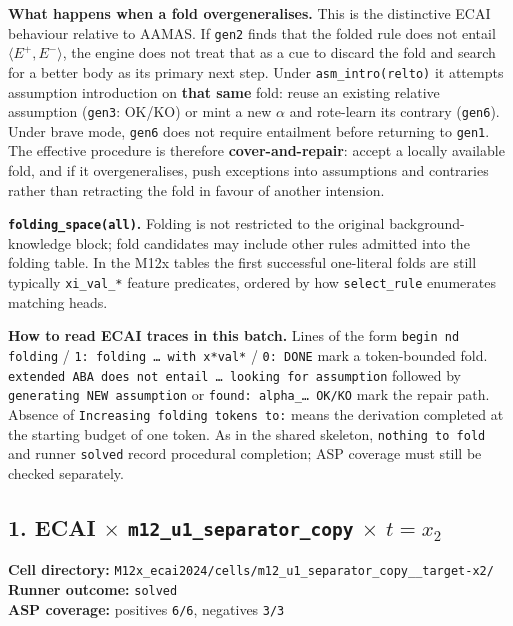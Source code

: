 \documentclass[11pt]{article}
\begin{document}
\textbf{What happens when a fold overgeneralises.} This is the distinctive ECAI behaviour relative to AAMAS. If \texttt{gen2} finds that the folded rule does not entail \(\langle E^+,E^-\rangle\), the engine does not treat that as a cue to discard the fold and search for a better body as its primary next step. Under \texttt{asm\_intro(relto)} it attempts assumption introduction on \textbf{that same} fold: reuse an existing relative assumption (\texttt{gen3}: OK/KO) or mint a new \(\alpha\) and rote-learn its contrary (\texttt{gen6}). Under brave mode, \texttt{gen6} does not require entailment before returning to \texttt{gen1}. The effective procedure is therefore \textbf{cover-and-repair}: accept a locally available fold, and if it overgeneralises, push exceptions into assumptions and contraries rather than retracting the fold in favour of another intension.

\textbf{\texttt{folding\_space(all)}.} Folding is not restricted to the original background-knowledge block; fold candidates may include other rules admitted into the folding table. In the M12x tables the first successful one-literal folds are still typically \texttt{xi\_val\_*} feature predicates, ordered by how \texttt{select\_rule} enumerates matching heads.

\textbf{How to read ECAI traces in this batch.} Lines of the form \texttt{begin nd folding} / \texttt{1: folding \ldots{} with x*val*} / \texttt{0: DONE} mark a token-bounded fold. \texttt{extended ABA does not entail \ldots{} looking for assumption} followed by \texttt{generating NEW assumption} or \texttt{found: alpha\_\ldots{} OK/KO} mark the repair path. Absence of \texttt{Increasing folding tokens to:} means the derivation completed at the starting budget of one token. As in the shared skeleton, \texttt{nothing to fold} and runner \texttt{solved} record procedural completion; ASP coverage must still be checked separately.

\subsection{\texorpdfstring{1. ECAI \(\times\) \texttt{m12\_u1\_separator\_copy} \(\times\) \(t=x_2\)}{1. ECAI - m12-u1-separator-copy - target x2}}

\textbf{Cell directory:} \texttt{M12x\_ecai2024/cells/m12\_u1\_separator\_copy\_\_target-x2/}\\
\textbf{Runner outcome:} \texttt{solved}\\
\textbf{ASP coverage:} positives \texttt{6/6}, negatives \texttt{3/3}
\end{document}

